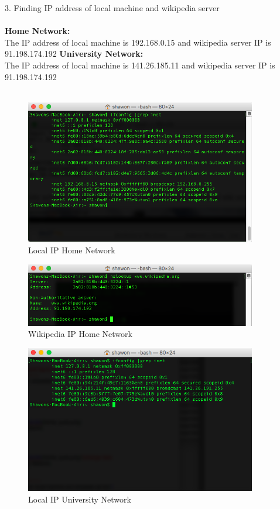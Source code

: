 \documentclass{WeSTassignment}
\begin{document}
\textrm{3. Finding IP address of local machine and wikipedia server}\\ \\
\textbf{Home Network:\\}
The IP address of local machine is 192.168.0.15 and wikipedia server IP is 91.198.174.192
\textbf{University Network:\\}
The IP address of local machine is 141.26.185.11 and wikipedia server IP is 91.198.174.192\\ \\
\begin{figure}[bp!]
  \centering
  \includegraphics[width=0.9\textwidth]{home_own_ip.png}
   \caption{Local IP Home Network}
     \label{fig:ipaddress}
\end{figure}
\begin{figure}[bp!]
  \centering
  \includegraphics[width=0.9\textwidth]{home_wiki_ip.png}
   \caption{Wikipedia IP Home Network}
     \label{fig:ipaddress}
\end{figure}
\begin{figure}[bp!]
  \centering
  \includegraphics[width=0.9\textwidth]{uni_own_ip.png}
   \caption{Local IP University Network}
     \label{fig:ipaddress}
\end{figure}
\end{document}
